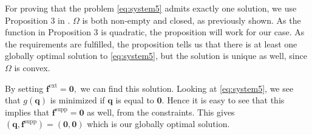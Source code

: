 For proving that the problem \eqref{eq:system5} admits exactly one solution, we use Proposition 3 in \cite{intOptCon}. $\Omega$ is both non-empty and closed, as previously shown. As the function in Proposition 3 is quadratic, the proposition will work for our case. As the requirements are fulfilled, the proposition tells us that there is at least one globally optimal solution to \eqref{eq:system5}, but the solution is unique as well, since $\Omega$ is convex.

By setting $\bm{f}^{\textrm{ext}} = \bm{0},$ we can find this solution. Looking at \eqref{eq:system5}, we see that $g(\bm{q})$ is minimized if $\bm{q}$ is equal to $\bm{0}$. Hence it is easy to see that this implies that $\bm{f}^{\textrm{supp}} = \bm{0}$ as well, from the constraints. This gives $(\bm{q},\bm{f}^{\textrm{supp}}) = (\bm{0},\bm{0})$ which is our globally optimal solution.



